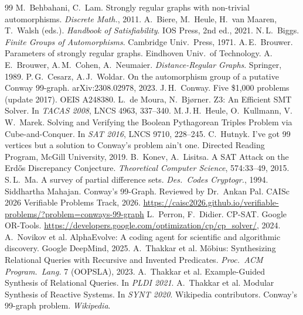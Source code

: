 \documentclass{article}
\begin{document}
\small
\sloppy
\setlength{\emergencystretch}{3em}
\begin{thebibliography}{99}
 M.\ Behbahani, C.\ Lam. Strongly regular graphs with non-trivial automorphisms. \emph{Discrete Math.}, 2011.
 A.\ Biere, M.\ Heule, H.\ van Maaren, T.\ Walsh (eds.). \emph{Handbook of Satisfiability}. IOS Press, 2nd ed., 2021.
 N.\,L.\ Biggs. \emph{Finite Groups of Automorphisms}. Cambridge Univ.\ Press, 1971.
 A.\,E.\ Brouwer. Parameters of strongly regular graphs. Eindhoven Univ.\ of Technology.
 A.\,E.\ Brouwer, A.\,M.\ Cohen, A.\ Neumaier. \emph{Distance-Regular Graphs}. Springer, 1989.
 P.\,G.\ Cesarz, A.\,J.\ Woldar. On the automorphism group of a putative Conway 99-graph. arXiv:2308.02978, 2023.
 J.\,H.\ Conway. Five \$1{,}000 problems (update 2017). OEIS A248380.
 L.\ de Moura, N.\ Bj{\o}rner. Z3: An Efficient SMT Solver. In \emph{TACAS 2008}, LNCS 4963, 337--340.
 M.\,J.\,H.\ Heule, O.\ Kullmann, V.\,W.\ Marek. Solving and Verifying the Boolean Pythagorean Triples Problem via Cube-and-Conquer. In \emph{SAT 2016}, LNCS 9710, 228--245.
 C.\ Hutnyk. I've got 99 vertices but a solution to Conway's problem ain't one. Directed Reading Program, McGill University, 2019.
 B.\ Konev, A.\ Lisitsa. A SAT Attack on the Erd{\H o}s Discrepancy Conjecture. \emph{Theoretical Computer Science}, 574:33--49, 2015.
 S.\,L.\ Ma. A survey of partial difference sets. \emph{Des.\ Codes Cryptogr.}, 1994.
 Siddhartha Mahajan. Conway's 99-Graph. Reviewed by Dr.\ Ankan Pal. CAISc 2026 Verifiable Problems Track, 2026. \url{https://caisc2026.github.io/verifiable-problems/?problem=conways-99-graph}
 L.\ Perron, F.\ Didier. CP-SAT. Google OR-Tools. \url{https://developers.google.com/optimization/cp/cp_solver/}, 2024.
 A.\ Novikov et al. AlphaEvolve: A coding agent for scientific and algorithmic discovery. Google DeepMind, 2025.
 A.\ Thakkar et al. M{\"o}bius: Synthesizing Relational Queries with Recursive and Invented Predicates. \emph{Proc.\ ACM Program.\ Lang.} 7 (OOPSLA), 2023.
 A.\ Thakkar et al. Example-Guided Synthesis of Relational Queries. In \emph{PLDI 2021}.
 A.\ Thakkar et al. Modular Synthesis of Reactive Systems. In \emph{SYNT 2020}.
 Wikipedia contributors. Conway's 99-graph problem. \emph{Wikipedia}.
\end{thebibliography}
\end{document}
